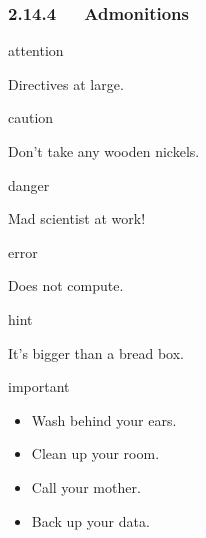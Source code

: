 \documentclass[a4paper]{article}
\begin{document}
\subsubsection{2.14.4   Admonitions%
  \label{admonitions}%
}

\begin{DUclass}{attention}
\begin{DUadmonition}

Directives at large.
\end{DUadmonition}
\end{DUclass}

\begin{DUclass}{caution}
\begin{DUadmonition}

Don’t take any wooden nickels.
\end{DUadmonition}
\end{DUclass}

\begin{DUclass}{danger}
\begin{DUadmonition}

Mad scientist at work!
\end{DUadmonition}
\end{DUclass}

\begin{DUclass}{error}
\begin{DUadmonition}

Does not compute.
\end{DUadmonition}
\end{DUclass}

\begin{DUclass}{hint}
\begin{DUadmonition}

It’s bigger than a bread box.
\end{DUadmonition}
\end{DUclass}

\begin{DUclass}{important}
\begin{DUadmonition}

\begin{itemize}
\item Wash behind your ears.

\item Clean up your room.

\item Call your mother.

\item Back up your data.
\end{itemize}
\end{DUadmonition}
\end{DUclass}
\end{document}
